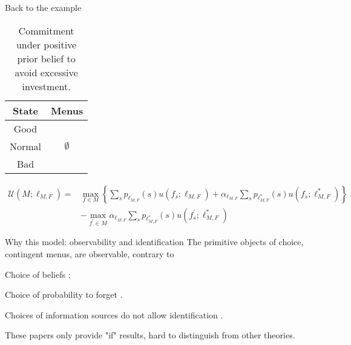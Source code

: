 \documentclass[usenames,dvipsnames,aspectratio=169,11pt, envcountsect, handout]{beamer}
\begin{document}
\begin{frame}{Back to the example}
\begin{table}[H]
\begin{minipage}{0.29\textwidth}
\begin{tabular}{c | c}
				State  & Menus                           \\
				\hline
				Good   & \multirow{3}{*}{ \(\emptyset\)} \\
				Normal &                                 \\
				Bad    &                                 \\
			\end{tabular}
			\vspace{0.5cm} %
		\end{minipage}
		\caption{Commitment under positive prior belief to avoid excessive investment.} %
		\label{tab:commitment1}
	\end{table}

	\begin{equation*}
		\begin{aligned}
			\mathcal{U} \left(M ; \ell_{M, F} \right) = & \max _{f \in M}\left\{\sum_{s} p_{\ell_{M, F}} \left( s \right) u \left( f_{s} ; \ell_{M, F} \right) + \alpha_{\ell_{M, F}} \sum_{s} p_{\ell^{*}_{M, F}} \left( s \right) u \left( f_{s} ; \ell^{*}_{M, F} \right) \right\} \\
			                                            & -\max _{f^{\prime} \in M} \alpha _{\ell_{M, F}} \sum_{s} p_{\ell^{*}_{M, F}} \left( s \right) u\left(f^{\prime}_{s} ; \ell^{*}_{M, F} \right) \:
		\end{aligned}
	\end{equation*}
\end{frame}

\begin{frame}{Why this model: observability and identification}
	The primitive objects of choice, contingent menus, are observable, contrary to

	\vfill

	\begin{wideitemize}
		\item Choice of beliefs \citep{brunnermeierOptimalExpectations2005,koszegiUtilityAnticipationPersonal2010};
		\item Choice of probability to forget \citep{benabou2016mindful}.
	\end{wideitemize}

	\vfill

	Choices of information sources do not allow identification \citep{eliazCanAnticipatoryFeelings2006}.

	\vfill

	These papers only provide "if" results, hard to distinguish from other theories.
\end{frame}
\end{document}
